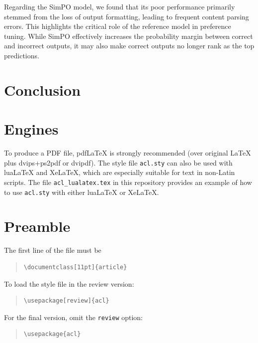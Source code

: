 \documentclass[11pt]{article}
\begin{document}
Regarding the SimPO model, we found that its poor performance primarily stemmed from the loss of output formatting, leading to frequent content parsing errors. This highlights the critical role of the reference model in preference tuning. While SimPO effectively increases the probability margin between correct and incorrect outputs, it may also make correct outputs no longer rank as the top predictions.

\section{Conclusion}

\section{Engines}

To produce a PDF file, pdf\LaTeX{} is strongly recommended (over original \LaTeX{} plus dvips+ps2pdf or dvipdf).
The style file \texttt{acl.sty} can also be used with
lua\LaTeX{} and
Xe\LaTeX{}, which are especially suitable for text in non-Latin scripts.
The file \texttt{acl\_lualatex.tex} in this repository provides
an example of how to use \texttt{acl.sty} with either
lua\LaTeX{} or
Xe\LaTeX{}.

\section{Preamble}

The first line of the file must be
\begin{quote}
\begin{verbatim}
\documentclass[11pt]{article}
\end{verbatim}
\end{quote}

To load the style file in the review version:
\begin{quote}
\begin{verbatim}
\usepackage[review]{acl}
\end{verbatim}
\end{quote}
For the final version, omit the \verb|review| option:
\begin{quote}
\begin{verbatim}
\usepackage{acl}
\end{verbatim}
\end{quote}
\end{document}
